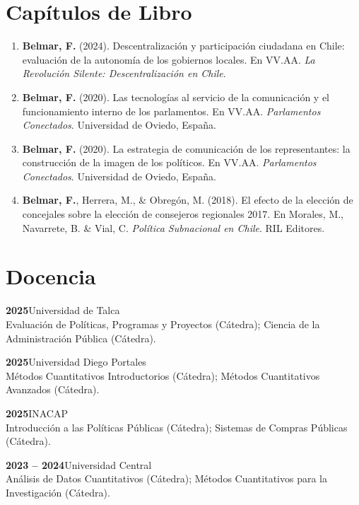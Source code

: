 \documentclass[11pt,a4paper]{article}
\newcommand{\cventry}[2]{\noindent\textbf{#1}\hfill #2\\}
\newcommand{\cventrysub}[1]{\noindent\hspace{0.5cm}#1\par\vspace{2pt}}
\begin{document}
\section{Capítulos de Libro}

\begin{enumerate}[leftmargin=*, label=\arabic*.]
    \item \textbf{Belmar, F.} (2024). Descentralización y participación ciudadana en Chile: evaluación de la autonomía de los gobiernos locales. En VV.AA. \textit{La Revolución Silente: Descentralización en Chile}.

    \item \textbf{Belmar, F.} (2020). Las tecnologías al servicio de la comunicación y el funcionamiento interno de los parlamentos. En VV.AA. \textit{Parlamentos Conectados}. Universidad de Oviedo, España.

    \item \textbf{Belmar, F.} (2020). La estrategia de comunicación de los representantes: la construcción de la imagen de los políticos. En VV.AA. \textit{Parlamentos Conectados}. Universidad de Oviedo, España.

    \item \textbf{Belmar, F.}, Herrera, M., \& Obregón, M. (2018). El efecto de la elección de concejales sobre la elección de consejeros regionales 2017. En Morales, M., Navarrete, B. \& Vial, C. \textit{Política Subnacional en Chile}. RIL Editores.
\end{enumerate}

\section{Docencia}

\cventry{2025}{Universidad de Talca}
\cventrysub{Evaluación de Políticas, Programas y Proyectos (Cátedra); Ciencia de la Administración Pública (Cátedra).}

\cventry{2025}{Universidad Diego Portales}
\cventrysub{Métodos Cuantitativos Introductorios (Cátedra); Métodos Cuantitativos Avanzados (Cátedra).}

\cventry{2025}{INACAP}
\cventrysub{Introducción a las Políticas Públicas (Cátedra); Sistemas de Compras Públicas (Cátedra).}

\cventry{2023 -- 2024}{Universidad Central}
\cventrysub{Análisis de Datos Cuantitativos (Cátedra); Métodos Cuantitativos para la Investigación (Cátedra).}
\end{document}
